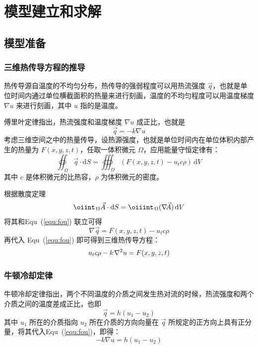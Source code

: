 \documentclass[../main.tex]{subfiles}
\begin{document}
\section{模型建立和求解}
\subsection{模型准备}

\subsubsection{三维热传导方程的推导}
热传导源自温度的不均匀分布，热传导的强弱程度可以用热流强度 \(\vec{q}\)，也就是单位时间内通过单位横截面积的热量来进行刻画，温度的不均匀程度可以用温度梯度 \(\nabla u\) 来进行刻画，其中 \(u\) 指的是温度。

傅里叶定律指出，热流强度和温度梯度 \(\nabla u\) 成正比，也就是
\begin{equation}\label{equ:fou}
\vec q = - k \nabla u
\end{equation}
考虑三维空间之中的热量传导，设热源强度，也就是单位时间内在单位体积内部产生的热量为 \(F (x,  y , z, t)\)，任取一体积微元 \(\Omega\)，应用能量守恒定律有：
\begin{equation}
\oiint _{\, \Omega} \vec q \cdot \mathrm{d} S = \oiiint _{\, \Omega} ( F (x , y , z,t) - u _{t} c \rho ) \, \mathrm{d} V
\end{equation}
其中 \(c\) 是体积微元的比热容，\(\rho\) 为体积微元的密度。

根据散度定理
\begin{equation}
\oiint _{\,\Omega} \vec A  \cdot \mathrm{d} S = \oiiint _{\,\Omega} ( \nabla\kern -1.8pt\vec A) \, \mathrm{d}V
\end{equation}
将其和Equ~(\ref{equ:fou}) 联立可得
\begin{equation}
\nabla \vec q = F (x , y , z ,t) - u_{t} c \rho
\end{equation}
再代入 Equ~(\ref{equ:fou}) 即可得到三维热传导方程：
\begin{equation}\label{equ:cond}
u_{t} c \rho - k\kern 1pt \nabla^{2} u = F (x , y , z, t)
\end{equation}

\subsubsection{牛顿冷却定律}
牛顿冷却定律指出，两个不同温度的介质之间发生热对流的时候，热流强度和两个介质之间的温度差成正比，也即
\begin{equation}
\vec q = h (u_1 - u_2)
\end{equation}
其中 \(u_1\) 所在的介质指向 \(u_2\) 所在介质的方向向量在 \(\vec q\) 所规定的正方向上具有正分量，将其代入Equ~(\ref{equ:fou})，即得：
\begin{equation}\label{equ:len}
{-k} \nabla u = h ( u_1 - u_2)
\end{equation}
\end{document}
